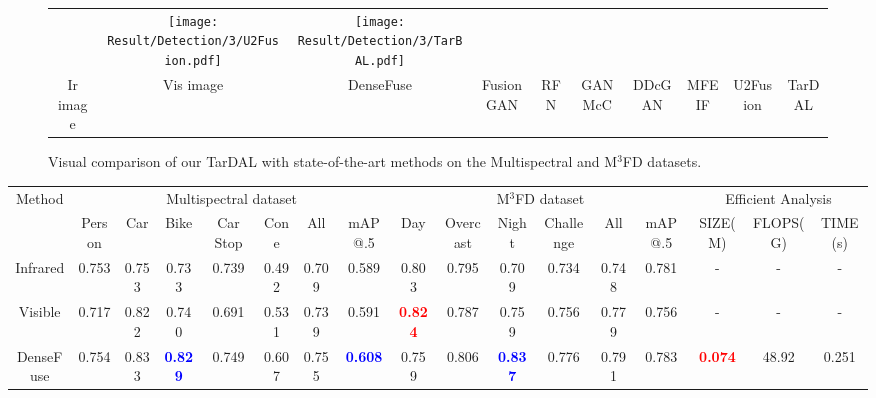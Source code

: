 \documentclass[10pt,twocolumn,letterpaper]{article}
\begin{document}
\begin{figure*}[!htb]
\begin{tabular}{cccccccccc}
		&\texttt{[image: Result/Detection/3/U2Fusion.pdf]}
		&\texttt{[image: Result/Detection/3/TarBAL.pdf]}
\\
		\footnotesize Ir image&\footnotesize Vis image&\footnotesize DenseFuse&\footnotesize FusionGAN&\footnotesize RFN&\footnotesize GANMcC&\footnotesize DDcGAN&\footnotesize MFEIF&\footnotesize U2Fusion&\footnotesize TarDAL	
		\\			
	\end{tabular}
	\vspace{-0.3cm}  
	\caption{Visual comparison of our TarDAL with state-of-the-art methods on the Multispectral and M$^3$FD datasets. }
	\label{fig:Visualdec}
\end{figure*}
\begin{table*}[!htb]
	\centering
	\renewcommand\arraystretch{1.1} 
	\setlength{\tabcolsep}{0.5mm}
	\begin{tabular}{|c|cccccc|c|ccccc|c|ccc|}
		\hline
		\multirow{2}{*}{\footnotesize Method}&\multicolumn{7}{c|}{\footnotesize Multispectral dataset}&\multicolumn{6}{c|}{\footnotesize M$^3$FD dataset}&\multicolumn{3}{c|}{\footnotesize Efficient Analysis}\\
		\cline{2-17} 
		~&\footnotesize Person&\footnotesize Car&\footnotesize Bike&\footnotesize Car Stop 
		&\footnotesize Cone &\footnotesize All&\footnotesize mAP@.5&\footnotesize Day&\footnotesize Overcast&\footnotesize Night&\footnotesize Challenge&\footnotesize All&\footnotesize mAP@.5&\footnotesize SIZE(M)&\footnotesize FLOPS(G)&\footnotesize TIME(s)\\
\hline
		\footnotesize Infrared&\footnotesize 0.753 &\footnotesize 0.753 &\footnotesize 0.733 &\footnotesize 0.739 &\footnotesize 0.492 &\footnotesize 0.709 &\footnotesize 0.589 &\footnotesize 0.803 &\footnotesize 0.795 &\footnotesize 0.709 &\footnotesize 0.734 &\footnotesize 0.748 &\footnotesize 0.781&-&-&-\\
		\hline 
		\footnotesize Visible&\footnotesize 0.717 &\footnotesize 0.822 &\footnotesize 0.740 &\footnotesize 0.691 &\footnotesize 0.531 &\footnotesize 0.739 &\footnotesize 0.591 &\footnotesize \textcolor{red}{\textbf{0.824}} &\footnotesize 0.787 &\footnotesize 0.759 &\footnotesize 0.756 &\footnotesize 0.779 &\footnotesize 0.756 &-&-&-\\
		\hline 
		
		\footnotesize DenseFuse&\footnotesize 0.754&\footnotesize 0.833&\footnotesize \textcolor{blue}{\textbf{0.829}}&\footnotesize 0.749&\footnotesize 0.607 &\footnotesize 0.755&\footnotesize \textcolor{blue}{\textbf{0.608}}&\footnotesize 0.759&\footnotesize 0.806&\footnotesize \textcolor{blue}{\textbf{0.837}}&\footnotesize 0.776&\footnotesize 0.791&\footnotesize 0.783&\footnotesize \textcolor{red}{\textbf{0.074}}&\footnotesize 48.92&\footnotesize 0.251  \\
		\hline 
		

\end{tabular}
\end{table*}
\end{document}
